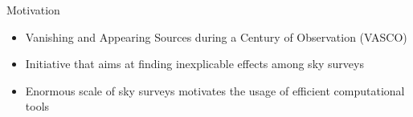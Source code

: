 \begin{frame}{Motivation}
    \begin{itemize}
        \item Vanishing and Appearing Sources during a Century of Observation (VASCO)
        \item Initiative that aims at finding inexplicable effects among sky surveys
        \item Enormous scale of sky surveys motivates the usage of efficient computational tools
    \end{itemize}
\end{frame}